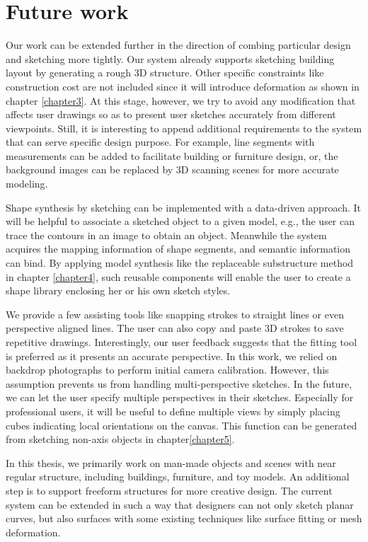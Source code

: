 \section{Future work}
\label{sec:future}

Our work can be extended further in the direction of combing particular design and sketching more tightly. Our system already supports sketching building layout by generating a rough 3D structure. Other specific constraints like construction cost are not included since it will introduce deformation as shown in chapter \ref{chapter3}. At this stage, however, we try to avoid any modification that affects user drawings so as to present user sketches accurately from different viewpoints. Still, it is interesting to append additional requirements to the system that can serve specific design purpose. For example, line segments with measurements can be added to facilitate building or furniture design, or, the background images can be replaced by 3D scanning scenes for more accurate modeling.

Shape synthesis by sketching can be implemented with a data-driven approach. It will be helpful to associate a sketched object to a given model, e.g., the user can trace the contours in an image to obtain an object. Meanwhile the system acquires the mapping information of shape segments, and semantic information can bind. By applying model synthesis like the replaceable substructure method in chapter \ref{chapter4}, such reusable components will enable the user to create a shape library enclosing her or his own sketch styles.

We provide a few assisting tools like snapping strokes to straight lines or even perspective aligned lines. The user can also copy and paste 3D strokes to save repetitive drawings. Interestingly, our user feedback suggests that the fitting tool is preferred as it presents an accurate perspective. In this work, we relied on backdrop photographs to perform initial camera calibration. However, this assumption prevents us from handling multi-perspective sketches. In the future, we can let the user specify multiple perspectives in their sketches. Especially for professional users, it will be useful to define multiple views by simply placing cubes indicating local orientations on the canvas. This function can be generated from sketching non-axis objects in chapter\ref{chapter5}.

In this thesis, we primarily work on man-made objects and scenes with near regular structure, including buildings, furniture, and toy models. An additional step is to support freeform structures for more creative design. The current system can be extended in such a way that designers can not only sketch planar curves, but also surfaces with some existing techniques like surface fitting or mesh deformation.

